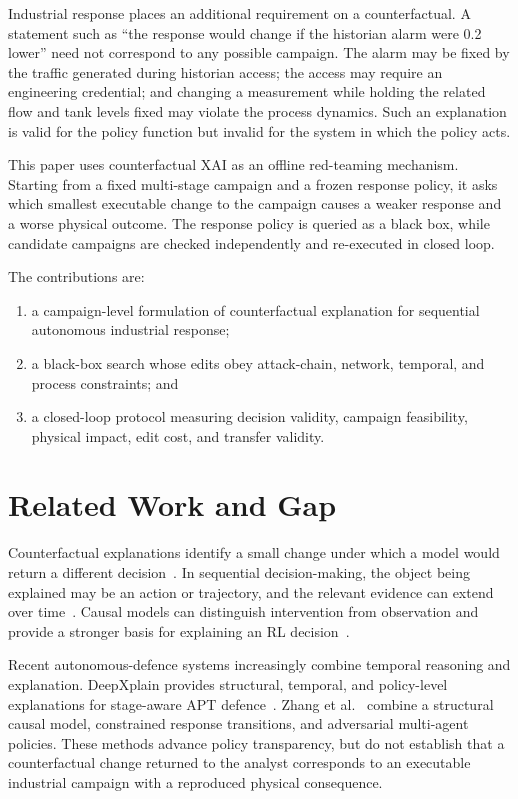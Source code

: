 \documentclass[conference]{IEEEtran}
\begin{document}
Industrial response places an additional requirement on a counterfactual. A
statement such as ``the response would change if the historian alarm were 0.2
lower'' need not correspond to any possible campaign. The alarm may be fixed by
the traffic generated during historian access; the access may require an
engineering credential; and changing a measurement while holding the related
flow and tank levels fixed may violate the process dynamics. Such an explanation
is valid for the policy function but invalid for the system in which the policy
acts.

This paper uses counterfactual XAI as an offline red-teaming mechanism. Starting
from a fixed multi-stage campaign and a frozen response policy, it asks which
smallest executable change to the campaign causes a weaker response and a worse
physical outcome. The response policy is queried as a black box, while candidate
campaigns are checked independently and re-executed in closed loop.

The contributions are:
\begin{enumerate}
    \item a campaign-level formulation of counterfactual explanation for
    sequential autonomous industrial response;
    \item a black-box search whose edits obey attack-chain, network, temporal,
    and process constraints; and
    \item a closed-loop protocol measuring decision validity, campaign
    feasibility, physical impact, edit cost, and transfer validity.
\end{enumerate}

\section{Related Work and Gap}

Counterfactual explanations identify a small change under which a model would
return a different decision~\cite{wachter2017counterfactual}. In sequential
decision-making, the object being explained may be an action or trajectory, and
the relevant evidence can extend over time~\cite{milani2024xrl}. Causal models
can distinguish intervention from observation and provide a stronger basis for
explaining an RL decision~\cite{madumal2020causal}.

Recent autonomous-defence systems increasingly combine temporal reasoning and
explanation. DeepXplain provides structural, temporal, and policy-level
explanations for stage-aware APT defence~\cite{phan2026deepxplain}. Zhang et
al.~\cite{zhang2026explainable} combine a structural causal model, constrained
response transitions, and adversarial multi-agent policies. These methods
advance policy transparency, but do not establish that a counterfactual change
returned to the analyst corresponds to an executable industrial campaign with
a reproduced physical consequence.
\end{document}
